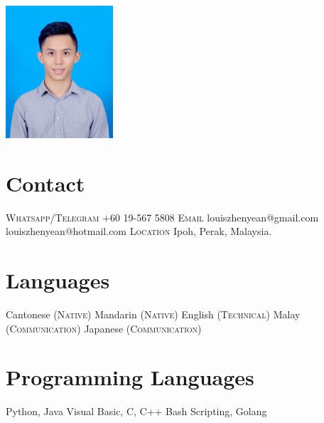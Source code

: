 \documentclass[English]{cv-style}
\begin{document}
\lastupdated

\begin{aside}
\includegraphics[width=4cm]{mypicture.jpg}
\section{Contact}\vspace{0.15cm}
\textsc{Whatsapp/Telegram}
+60 19-567 5808
\vspace{0.2cm} \textsc{Email}
louiszhenyean@gmail.com
louiszhenyean@hotmail.com
\vspace{0.2cm} \textsc{Location}
Ipoh, Perak, Malaysia.
\section{Languages}\vspace{0.15cm}
Cantonese   \textsc{(Native)}
Mandarin    \textsc{(Native)}
English     \textsc{(Technical)}
Malay       \textsc{(Communication)}
Japanese    \textsc{(Communication)}
\section{Programming Languages}\vspace{0.15cm}
Python, Java
Visual Basic, C, C++
Bash Scripting, Golang

\end{aside}
\end{document}
